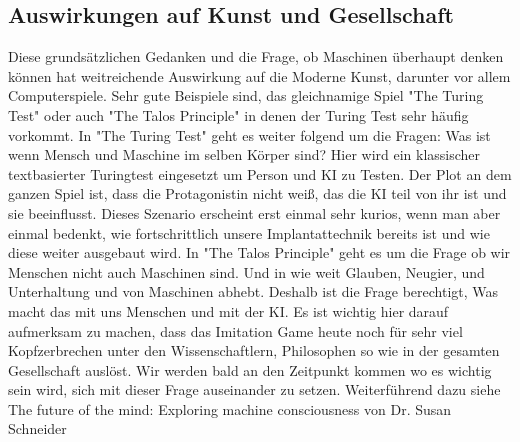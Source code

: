 \subsection{Auswirkungen auf Kunst und Gesellschaft}
Diese grundsätzlichen Gedanken und die Frage, ob Maschinen überhaupt denken können hat weitreichende Auswirkung auf die Moderne Kunst, darunter vor allem Computerspiele. Sehr gute Beispiele sind, das gleichnamige Spiel "The Turing Test" oder auch "The Talos Principle" in denen der Turing Test sehr häufig vorkommt. In "The Turing Test" geht es weiter folgend um die Fragen: Was ist wenn Mensch und Maschine im selben Körper sind? Hier wird ein klassischer textbasierter Turingtest eingesetzt um Person und KI zu Testen. Der Plot an dem ganzen Spiel ist, dass die Protagonistin nicht weiß, das die KI teil von ihr ist und sie beeinflusst. Dieses Szenario erscheint erst einmal sehr kurios, wenn man aber einmal bedenkt, wie fortschrittlich unsere Implantattechnik bereits ist und wie diese weiter ausgebaut wird. In "The Talos Principle" geht es um die Frage ob wir Menschen nicht auch Maschinen sind. Und in wie weit Glauben, Neugier, und Unterhaltung und von Maschinen abhebt. Deshalb ist die Frage berechtigt, Was macht das mit uns Menschen und mit der KI. Es ist wichtig hier darauf aufmerksam zu machen, dass das Imitation Game heute noch für sehr viel Kopfzerbrechen unter den Wissenschaftlern, Philosophen so wie in der gesamten Gesellschaft auslöst. Wir werden bald an den Zeitpunkt kommen wo es wichtig sein wird, sich mit dieser Frage auseinander zu setzen. Weiterführend dazu siehe The future of the mind: Exploring machine consciousness von Dr. Susan Schneider\cite{explorecons}

